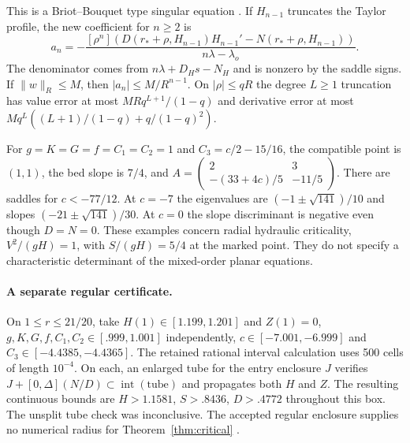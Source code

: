\documentclass[12pt,a4paper,oneside]{report}
\numberwithin{equation}{chapter}
\theoremstyle{remark}\newtheorem{remark}[theorem]{Remark}
\begin{document}
This is a Briot--Bouquet type singular equation \cite{westreich1982}. If $H_{n-1}$ truncates the Taylor profile, the new coefficient for $n\ge2$ is
\[
 a_n=-\frac{[\rho^n](D(r_*+\rho,H_{n-1})H_{n-1}'-N(r_*+\rho,H_{n-1}))}
               {n\lambda-\lambda_o}.
\]
The denominator comes from $n\lambda+D_Hs-N_H$ and is nonzero by the saddle signs. If $\|w\|_R\le M$, then $|a_n|\le M/R^{n-1}$. On $|\rho|\le qR$ the degree $L\ge1$ truncation has value error at most $MRq^{L+1}/(1-q)$ and derivative error at most
$M q^L((L+1)/(1-q)+q/(1-q)^2)$.

For $g=K=G=f=C_1=C_2=1$ and $C_3=c/2-15/16$, the compatible point is $(1,1)$, the bed slope is $7/4$, and
$A=\left(\begin{smallmatrix}2&3\\-(33+4c)/5&-11/5\end{smallmatrix}\right)$.
There are saddles for $c<-77/12$. At $c=-7$ the eigenvalues are $(-1\pm\sqrt{141})/10$ and slopes $(-21\pm\sqrt{141})/30$. At $c=0$ the slope discriminant is negative even though $D=N=0$. These examples concern radial hydraulic criticality, $V^2/(gH)=1$, with $S/(gH)=5/4$ at the marked point. They do not specify a characteristic determinant of the mixed-order planar equations.

\paragraph{A separate regular certificate.}
On $1\le r\le21/20$, take $H(1)\in[1.199,1.201]$ and $Z(1)=0$,
$g,K,G,f,C_1,C_2\in[.999,1.001]$ independently, $c\in[-7.001,-6.999]$ and $C_3\in[-4.4385,-4.4365]$. The retained rational interval calculation uses 500 cells of length $10^{-4}$. On each, an enlarged tube for the entry enclosure $J$ verifies $J+[0,\Delta](N/D)\subset\operatorname{int}(\text{tube})$ and propagates both $H$ and $Z$. The resulting continuous bounds are $H>1.1581$, $S>.8436$, $D>.4772$ throughout this box. The unsplit tube check was inconclusive. The accepted regular enclosure supplies no numerical radius for Theorem~\ref{thm:critical} \cite{theoremartifact}.
\end{document}
